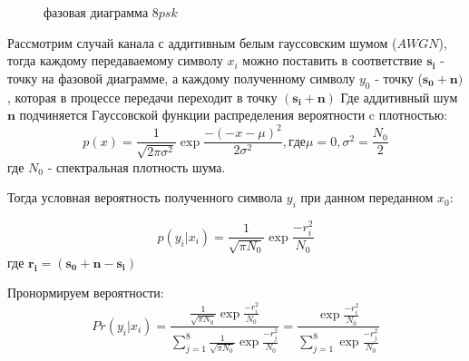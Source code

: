 \documentclass{ITaSconf}
\begin{document}
\begin{figure} [h]
\caption{фазовая диаграмма $8psk$}
\label{fig:image}
\end{figure}

 Рассмотрим случай канала с аддитивным белым гауссовским шумом ($AWGN$), тогда каждому передаваемому символу $x_i$ можно поставить в соответствие $\mathbold{s_i}$ - точку на фазовой диаграмме, а каждому полученному символу $y_0$ - точку ($\mathbold{s_0}+\mathbold{n})$, которая в процессе передачи переходит в точку $(\mathbold{s_i}+\mathbold{n})$ 
Где аддитивный шум $\mathbold{n}$ подчиняется Гауссовской функции распределения вероятности c плотностью:
\begin{equation}\label{eq:gaus}
p(x)=\frac{1}{\sqrt{2\pi\sigma^2}}\exp{\frac{-(-x-\mu)^2}{2\sigma^2}}, где \mu=0, \sigma^2=\frac{N_0}{2}
 \end{equation}
где $N_0$ - спектральная плотность шума.

Тогда условная вероятность полученного символа $y_i$ при данном переданном $x_0$:

\begin{equation}\label{eq:probab}
p(y_i|x_i)=\frac{1}{\sqrt{\pi N_0}}\exp{\frac{-r_i^2}{N_0}}
 \end{equation}
 где $\mathbold{r_i}=(\mathbold{s_0}+\mathbold{n}-\mathbold{s_i})$ 
 	
Пронормируем вероятности: 
\begin{equation}\label{eq:normprobab}
Pr(y_i|x_i)=\frac{\frac{1}{\sqrt{\pi N_0}}\exp{\frac{-r_i^2}{N_0}}}{\sum_{j=1}^8\frac{1}{\sqrt{\pi N_0}}\exp{\frac{-r_j^2}{N_0}}}
=\frac{\exp{\frac{-r_i^2}{N_0}}}{{\sum_{j=1}^8\exp{\frac{-r_j^2}{N_0}}}}
 \end{equation}
 
\end{document}

